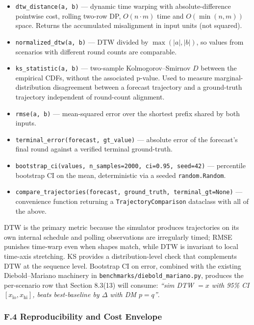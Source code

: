 \documentclass[
]{article}
\providecommand{\tightlist}{%
  \setlength{\itemsep}{0pt}\setlength{\parskip}{0pt}}
\begin{document}
\begin{itemize}
\tightlist
\item
  \texttt{dtw\_distance(a,\ b)} --- dynamic time warping with
  absolute-difference pointwise cost, rolling two-row DP,
  \(O(n \cdot m)\) time and \(O(\min(n, m))\) space. Returns the
  accumulated misalignment in input units (not squared).
\item
  \texttt{normalized\_dtw(a,\ b)} --- DTW divided by \(\max(|a|, |b|)\),
  so values from scenarios with different round counts are comparable.
\item
  \texttt{ks\_statistic(a,\ b)} --- two-sample Kolmogorov--Smirnov \(D\)
  between the empirical CDFs, without the associated p-value. Used to
  measure marginal-distribution disagreement between a forecast
  trajectory and a ground-truth trajectory independent of round-count
  alignment.
\item
  \texttt{rmse(a,\ b)} --- mean-squared error over the shortest prefix
  shared by both inputs.
\item
  \texttt{terminal\_error(forecast,\ gt\_value)} --- absolute error of
  the forecast's final round against a verified terminal ground-truth.
\item
  \texttt{bootstrap\_ci(values,\ n\_samples=2000,\ ci=0.95,\ seed=42)}
  --- percentile bootstrap CI on the mean, deterministic via a seeded
  \texttt{random.Random}.
\item
  \texttt{compare\_trajectories(forecast,\ ground\_truth,\ terminal\_gt=None)}
  --- convenience function returning a \texttt{TrajectoryComparison}
  dataclass with all of the above.
\end{itemize}

DTW is the primary metric because the simulator produces trajectories on
its own internal schedule and polling observations are irregularly
timed; RMSE punishes time-warp even when shapes match, while DTW is
invariant to local time-axis stretching. KS provides a
distribution-level check that complements DTW at the sequence level.
Bootstrap CI on error, combined with the existing Diebold--Mariano
machinery in \texttt{benchmarks/diebold\_mariano.py}, produces the
per-scenario row that Section 8.3(13) will consume: \emph{``sim DTW
\(= x\) with 95\% CI \([x_{\text{lo}}, x_{\text{hi}}]\), beats
best-baseline by \(\Delta\) with DM \(p = q\)''}.

\subsubsection{F.4 Reproducibility and Cost
Envelope}\label{f.4-reproducibility-and-cost-envelope}
\end{document}

